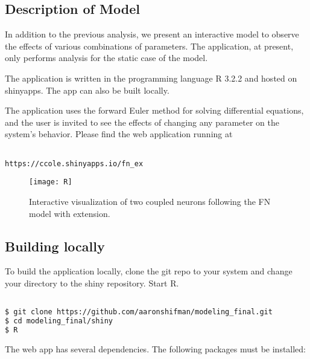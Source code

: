 \documentclass[11pt]{report}
\begin{document}
\subsection{Description of Model} %
\label{sub:description_of_model}

In addition to the previous analysis, we present an interactive model to observe the effects of various combinations of parameters. The application, at present, only performs analysis for the static case of the model.

The application is written in the programming language R 3.2.2 and hosted on shinyapps. The app can also be built locally. 

The application uses the forward Euler method for solving differential equations, and the user is invited to see the effects of changing any parameter on the system's behavior. Please find the web application running at 

\begin{lstlisting}
  
https://ccole.shinyapps.io/fn_ex

\end{lstlisting}




\begin{figure}[!ht]
  \caption{Interactive visualization of two coupled neurons following the FN model with extension. }
  \centering
    \texttt{[image: R]}
\end{figure}

\newpage

\subsection{Building locally} %
\label{sub:building_locally}

To build the application locally, clone the git repo to your system and change your directory to the shiny repository. Start R. 

\begin{lstlisting}[language = sh]

$ git clone https://github.com/aaronshifman/modeling_final.git
$ cd modeling_final/shiny 
$ R

\end{lstlisting}

The web app has several dependencies. The following packages must be installed:
\end{document}
